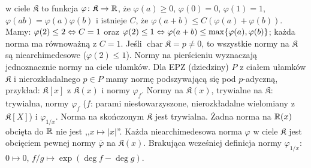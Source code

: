   w ciele $\mathfrak K$ to funkcja $\varphi \colon \mathfrak K \to \mathbb{R}$, że $\varphi(a) \ge 0$, $\varphi(0
) = 0$, $\varphi(1) = 1$, $\varphi(ab) = \varphi(a)\varphi(b)$ i istnieje $C$, że $\varphi(a+b) \le C (\varphi(a) + \varphi(b))$.
Mamy: $\varphi(2) \le 2 \Leftrightarrow C =1$ oraz $\varphi(2) \le 1 \Leftrightarrow \varphi(a+b) \le \max \{\varphi(a), \varphi(b)\}$; każda norma ma równoważną z $C = 1$.
Jeśli $\operatorname{char} \mathfrak K = p \neq 0$, to wszystkie normy na $\mathfrak K$ są niearchimedesowe ($\varphi(2) \le 1$).
Normy  na pierścieniu wyznaczają jednoznacznie normy na ciele ułamków.
Dla EPZ (dziedziny) $P$ z ciałem ułamków $\mathfrak K$ i nierozkładalnego $p \in P$ mamy normę podszywającą się pod $p$-adyczną, przykład: $\mathfrak K[x]$ z $\mathfrak K(x)$ i normy $\varphi_f$.
Normy  na $\mathfrak K(x)$, trywialne na $\mathfrak K$: trywialna, normy $\varphi_f$ ($f$: parami niestowarzyszone, nierozkładalne wielomiany z $\mathfrak K[X]$) i $\varphi_{1/x}$.
Norma na skończonym $\mathfrak K$ jest trywialna.
Żadna norma na $\mathbb{R}(x)$ obcięta do $\mathbb{R}$ nie jest ,,$x \mapsto |x|$''.
Każda niearchimedesowa norma $\varphi$ w ciele $\mathfrak K$ jest obcięciem pewnej normy $\overline \varphi$ na $\mathfrak K(x)$.
Brakująca wcześniej definicja normy $\varphi_{1/x}$: $0 \mapsto 0$, $f/g \mapsto \exp (\operatorname{deg} f - \operatorname{deg} g)$.